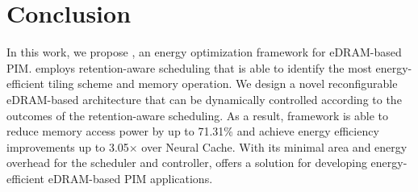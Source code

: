 

\section{Conclusion}
\label{conclusion}

In this work, we propose \sysname, an energy optimization framework for eDRAM-based PIM. \sysname employs retention-aware scheduling that is able to identify the most energy-efficient tiling scheme and memory operation. We design a novel reconfigurable eDRAM-based architecture that can be dynamically controlled according to the outcomes of the retention-aware scheduling. As a result, \sysname framework is able to reduce memory access power by up to 71.31\% and achieve energy efficiency improvements up to 3.05$\times$ over Neural Cache. With its minimal area and energy overhead for the scheduler and controller, \sysname offers a solution for developing energy-efficient eDRAM-based PIM applications.
